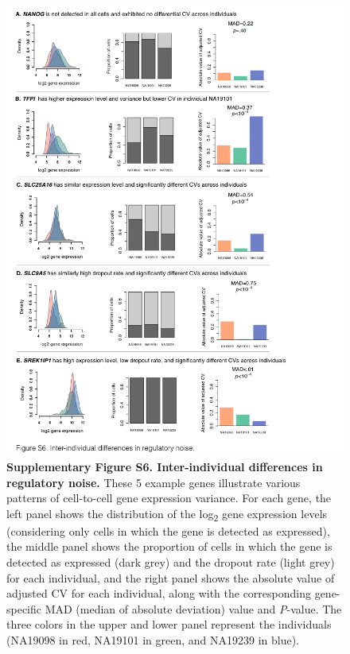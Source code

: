 \begin{figure}[htbp]
\centering
\includegraphics[width=5in]{img/ch04/Figure11.jpeg}
\caption{\textbf{Supplementary Figure S6. Inter-individual differences
in regulatory noise.} These 5 example genes illustrate various patterns
of cell-to-cell gene expression variance. For each gene, the left panel
shows the distribution of the log\textsubscript{2} gene expression
levels (considering only cells in which the gene is detected as
expressed), the middle panel shows the proportion of cells in which the
gene is detected as expressed (dark grey) and the dropout rate (light
grey) for each individual, and the right panel shows the absolute value
of adjusted CV for each individual, along with the corresponding
gene-specific MAD (median of absolute deviation) value and
\emph{P}-value. The three colors in the upper and lower panel represent
the individuals (NA19098 in red, NA19101 in green, and NA19239 in
blue).}
\end{figure}

